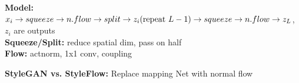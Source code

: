 \textbf{Model:} $x_i \rightarrow squeeze \rightarrow n.flow \rightarrow split \rightarrow z_i (\text{repeat } L-1)\\
\rightarrow squeeze \rightarrow n.flow \rightarrow z_L$, $z_i$ are outputs\\
\textbf{Squeeze/Split:} reduce spatial dim, pass on half\\
\textbf{Flow:} actnorm, 1x1 conv, coupling\\

\textbf{StyleGAN vs. StyleFlow:} Replace mapping Net with normal flow\\
